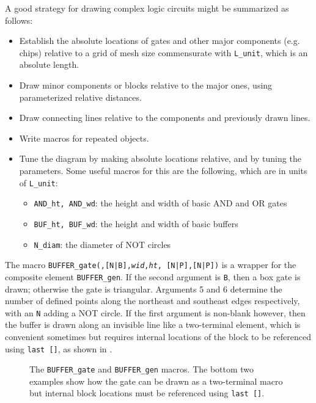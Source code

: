 A good strategy for drawing complex logic circuits might be summarized
as follows:
\begin{itemize}\itemsep=0pt
\item Establish the absolute locations of gates and other major components
  (e.g. chips) relative to a grid of mesh size commensurate with
  {\tt L\_unit}, which is an absolute length.
\item Draw minor components or blocks relative to the major ones, using
   parameterized relative distances.
\item Draw connecting lines relative to the components and previously drawn
   lines.
\item Write macros for repeated objects.
\item Tune the diagram by making absolute locations relative, and by tuning
   the parameters.
   Some useful macros for this are the following, which are in units of
  {\tt L\_unit}:
   \begin{itemize}
   \item[] {\tt AND\_ht, AND\_wd}: the height and width of basic AND and
     OR gates
   \item[] {\tt BUF\_ht, BUF\_wd}: the height and width of basic buffers
   \item[] {\tt N\_diam}: the diameter of NOT circles
   \end{itemize}
   \end{itemize}

The macro {\tt BUFFER\_gate(\linespec,[N|B],{\sl wid},{\sl ht},%
 [N|P],[N|P])}
is a wrapper for the composite element {\tt BUFFER\_gen}.
If the second argument is {\tt B}, then a box gate is drawn; otherwise
the gate is triangular.  Arguments 5 and 6 determine the number of defined
points along the northeast and southeast edges respectively, with an {\tt N}
adding a NOT circle.
If the first argument is non-blank however, then the buffer is drawn along
an invisible line like a two-terminal element, which is convenient sometimes
but requires internal locations of the block to be referenced using
{\tt last []}, as shown in .
\begin{figure}[h!t]
   \vspace*{-\baselineskip}
   
   \caption{The {\tt BUFFER\_gate} and {\tt BUFFER\_gen} macros.
     The bottom two examples show how the gate can be drawn as a two-terminal
     macro but internal block locations must be referenced using
     {\tt last []}.}
   \label{Buffer}
   \end{figure}

